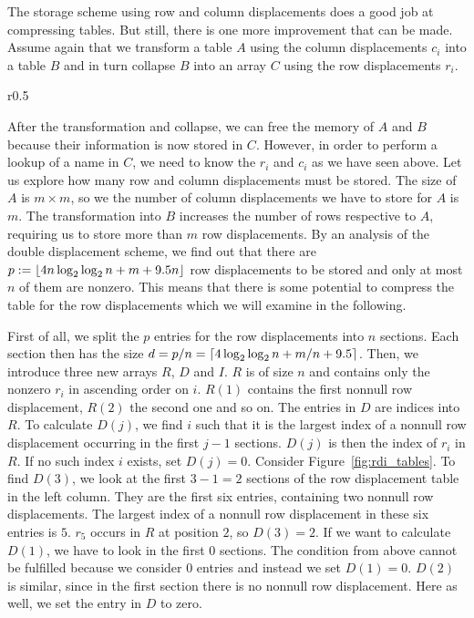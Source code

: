 The storage scheme using row and column displacements does a good job at compressing tables.
But still, there is one more improvement that can be made.
Assume again that we transform a table $A$ using the column displacements $c_i$ into a table $B$ and in turn collapse $B$ into an array $C$ using the row displacements $r_i$.
%
\begin{wrapfigure}{r}{0.5\textwidth}
	\centering
	
	\caption{\small Row displacement directory for $p = 12, n = 4$, $d = 3$ with the arrays $R, D$ and $I$. $D$ indexes into $R$, $I$ contains offsets for the indices in $D$. \label{fig:rdi_tables}}
\end{wrapfigure}
%
After the transformation and collapse, we can free the memory of $A$ and $B$ because their information is now stored in $C$.
However, in order to perform a lookup of a name in $C$, we need to know the $r_i$ and $c_i$ as we have seen above.
Let us explore how many row and column displacements must be stored.
The size of $A$ is $m \times m$, so we the number of column displacements we have to store for $A$ is $m$.
The transformation into $B$ increases the number of rows respective to $A$, requiring us to store more than $m$ row displacements.
By an analysis of the double displacement scheme, we find out that there are
$p := \left\lfloor 4 n \log_2 \log_2 n + m + 9.5 n \right\rfloor$ row displacements to be stored and only at most $n$ of them are nonzero.
This means that there is some potential to compress the table for the row displacements which we will examine in the following.

First of all, we split the $p$ entries for the row displacements into $n$ sections.
Each section then has the size $d = p/n = \left\lceil 4 \log_2 \log_2 n + m/n + 9.5 \right\rceil$.
Then, we introduce three new arrays $R$, $D$ and $I$.
$R$ is of size $n$ and contains only the nonzero $r_i$ in ascending order on $i$.
$R(1)$ contains the first nonnull row displacement, $R(2)$ the second one and so on.
The entries in $D$ are indices into $R$.
To calculate $D(j)$, we find $i$ such that it is the largest index of a nonnull row displacement occurring in the first $j - 1$ sections.
$D(j)$ is then the index of $r_i$ in $R$.
If no such index $i$ exists, set $D(j) = 0$.
Consider Figure~\ref{fig:rdi_tables}.
To find $D(3)$, we look at the first $3 - 1 = 2$ sections of the row displacement table in the left column.
They are the first six entries, containing two nonnull row displacements.
The largest index of a nonnull row displacement in these six entries is $5$.
$r_5$ occurs in $R$ at position $2$, so $D(3) = 2$.
If we want to calculate $D(1)$, we have to look in the first $0$ sections.
The condition from above cannot be fulfilled because we consider 0 entries and instead we set $D(1) = 0$.
$D(2)$ is similar, since in the first section there is no nonnull row displacement.
Here as well, we set the entry in $D$ to zero.

